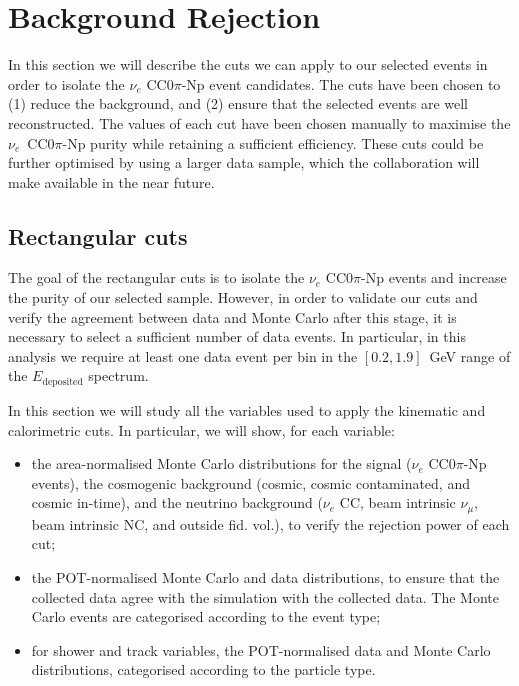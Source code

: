 \section{Background Rejection}\label{sec:bkg}
In this section we will describe the cuts we can apply to our selected events in order to isolate the $\nu_{e}$ CC$0\pi$-Np event candidates. The cuts have been chosen to (1) reduce the background, and (2) ensure that the selected events are well reconstructed. The values of each cut have been chosen manually to maximise the $\nu_e$~CC0$\pi$-Np purity while retaining a sufficient efficiency. These cuts could be further optimised by using a larger data sample, which the collaboration will make available in the near future. %


\subsection{Rectangular cuts}\label{sec:cuts}
The goal of the rectangular cuts is to isolate the $\nu_e$ CC0$\pi$-Np events and increase the purity of our selected sample. However, in order to validate our cuts and verify the agreement between data and Monte Carlo after this stage, it is necessary to select a sufficient number of data events. In particular, in this analysis we require at least one data event per bin in the $[0.2,1.9]$~GeV range of the $E_{\mathrm{deposited}}$ spectrum.%

In this section we will study all the variables used to apply the kinematic and calorimetric cuts. In particular, we will show, for each variable:
\begin{itemize}
\item the area-normalised Monte Carlo distributions for the signal ($\nu_{e}$ CC0$\pi$-Np events), the cosmogenic background (cosmic, cosmic contaminated, and cosmic in-time), and the neutrino background ($\nu_{e}$ CC, beam intrinsic $\nu_{\mu}$, beam intrinsic NC, and outside fid. vol.), to verify the rejection power of each cut;
\item the POT-normalised Monte Carlo and data distributions, to ensure that the collected data agree with the simulation with the collected data. The Monte Carlo events are categorised according to the event type;
\item for shower and track variables, the POT-normalised data and Monte Carlo distributions, categorised according to the particle type. 
\end{itemize}

